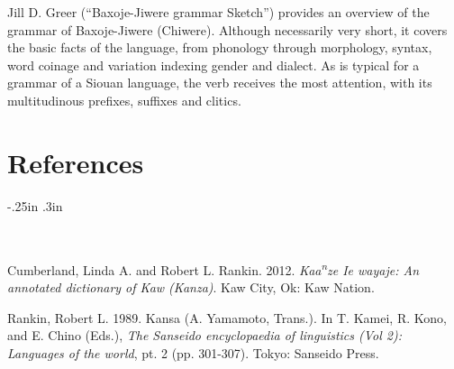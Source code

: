 \begin{refsection}
Jill D. Greer (``Baxoje-Jiwere grammar Sketch'') provides an overview of the grammar of Baxoje-Jiwere (Chiwere). Although necessarily very short, it covers the basic facts of the language, from phonology through morphology, syntax, word coinage and variation indexing gender and dialect. As is typical for a grammar of a Siouan language, the verb receives the most attention, with its multitudinous prefixes, suffixes and clitics. 

\section*{References}

\newenvironment{reflist} {\begin{list} {} {\listparindent -.25in
\leftmargin .3in} \item \ \vspace{-.3in} } {\end{list} }

\begin{reflist}

Cumberland, Linda A. and Robert L. Rankin. 2012. \textit{Kaa\textsuperscript{n}ze Ie wayaje: An annotated dictionary of Kaw (Kanza)}. Kaw City, Ok: Kaw Nation.

Rankin, Robert L. 1989. Kansa (A. Yamamoto, Trans.). In T. Kamei, R. Kono, and E. Chino (Eds.), \textit{The Sanseido encyclopaedia of linguistics (Vol 2): Languages of the world}, pt. 2 (pp. 301-307). Tokyo: Sanseido Press.

\end{reflist}
\end{refsection}

